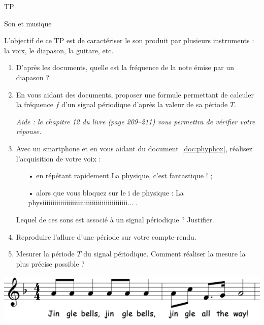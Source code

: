 \documentclass[12pt,a4paper]{article}
\begin{document}
\begin{header}
TP

Son et musique
\end{header}

L'objectif de ce TP est de caractériser le son produit par plusieurs instruments : la voix, le diapason, la guitare, etc.

\begin{enumerate}
\item \app{}
\label{quest:diapason}

D'après les documents, quelle est la fréquence de la note émise par un diapason ?

\item \app{}

En vous aidant des documents, proposer une formule permettant de calculer la fréquence $f$ d'un signal périodique d'après la valeur de sa période $T$.

\emph{Aide : le chapitre 12 du livre (page 209--211) vous permettra de vérifier votre réponse.}

\item \rea{} \anarai{}

Avec un smartphone et en vous aidant du document~\ref{doc:phyphox}, réalisez l'acquisition de votre voix : 
\begin{itemize}
\item[•] en répétant rapidement \og La physique, c'est fantastique !\fg{} ;
\item[•] alors que vous bloquez sur le \og i \fg{} de physique : \og La physiiiiiiiiiiiiiiiiiiiiiiiiiiiiiiiiiiiiiiiiiii... \fg{}.
\end{itemize}
Lequel de ces sons est associé à un signal périodique ?
Justifier.

\item \rea{}

Reproduire l'allure d'une période sur votre compte-rendu.

\item \rea{}

Mesurer la période $T$ du signal périodique.
Comment réaliser la mesure la plus précise possible ?
\end{enumerate}

\vfill

\begin{center}
\includegraphics[scale=0.35]{images/jingle_bells.png}
\end{center}
\end{document}
